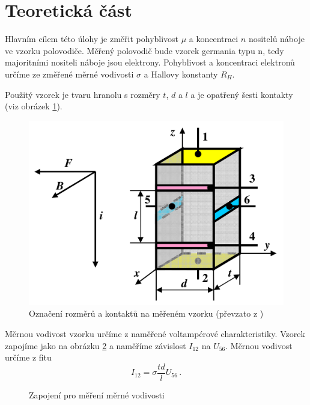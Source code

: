 \section*{Teoretická část}

Hlavním cílem této úlohy je změřit pohyblivost $\mu$ a koncentraci $n$ nositelů náboje ve vzorku polovodiče.
Měřený polovodič bude vzorek germania typu n, tedy majoritními nositeli náboje jsou elektrony.
Pohyblivost a koncentraci elektronů určíme ze změřené měrné vodivosti $\sigma$ a Hallovy konstanty $R_H$.

Použitý vzorek je tvaru hranolu s rozměry $t$, $d$ a $l$ a je opatřený šesti kontakty (viz obrázek \ref{obr:vzorek}).

\begin{figure}[htbp]
\centering
\includegraphics[width=\textwidth-2cm]{graficos/vzorek}
\caption{Označení rozměrů a kontaktů na měřeném vzorku (převzato z \cite{skripta})}
\label{obr:vzorek}
\end{figure}

Měrnou vodivost vzorku určíme z naměřené voltampérové charakteristiky.
Vzorek zapojíme jako na obrázku \ref{obr:schemaodpor} a naměříme závislost $I_{12}$ na $U_{56}$.
Měrnou vodivost určíme z fitu
\begin{equation}
I_{12}=\sigma \frac{td}{l} U_{56} \,.
\end{equation}

\begin{figure}[htbp]
\centering
\caption{Zapojení pro měření měrné vodivosti}
\label{obr:schemaodpor}
\end{figure}

